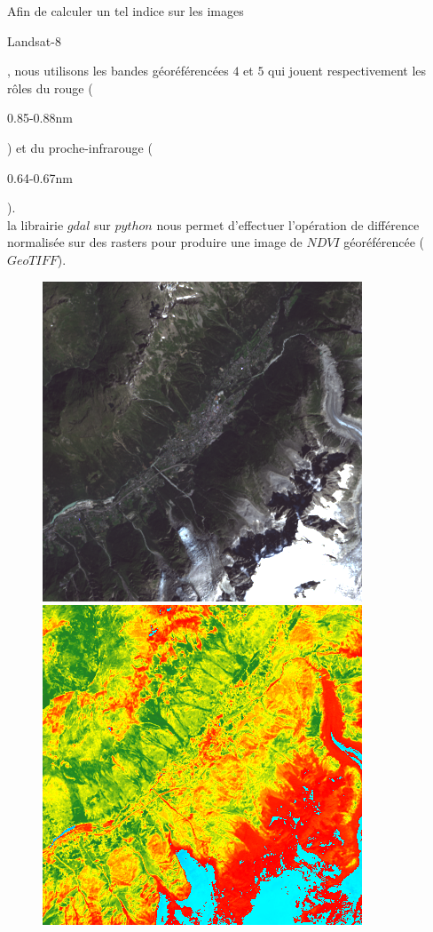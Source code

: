 \documentclass{book}
\begin{document}
Afin de calculer un tel indice sur les images \begin{itshape}Landsat-8\end{itshape}, nous utilisons les bandes géoréférencées $4$ et $5$ 
qui jouent respectivement les r\^oles du rouge (\begin{itshape}0.85-0.88nm\end{itshape}) et du proche-infrarouge (\begin{itshape}0.64-0.67nm\end{itshape}).\\
la librairie $gdal$ \cite{dans-gdal} sur $python$ nous permet d'effectuer l'opération de différence normalisée sur des rasters pour produire une image de $NDVI$ géoréférencée ($GeoTIFF$).

\begin{figure}[H]
\centerline{
\includegraphics[scale=0.45]{../3_ndvi/images/Chamonix/08_rgb.png}
\includegraphics[scale=0.45]{../3_ndvi/images/Chamonix/08_ndvi.png}
}
\end{figure}
\end{document}
